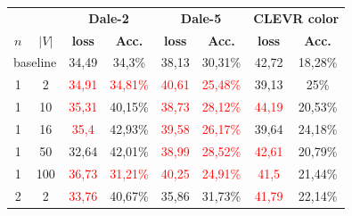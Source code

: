 \begin{table}[ht]
    \centering
    \begin{tabular}{cc|cc|cc|cc}
        \toprule
                                      &         & \multicolumn{2}{c}{\textbf{Dale-2}} & \multicolumn{2}{c}{\textbf{Dale-5}} & \multicolumn{2}{c}{\textbf{CLEVR color}}                                                                                \\  \cmidrule(lr){3-4}\cmidrule(lr){5-6}\cmidrule(lr){7-8}
        $n$                           & $|V|$   & \textbf{loss}                       & \textbf{Acc.}                       & \textbf{loss}                            & \textbf{Acc.}            & \textbf{loss}          & \textbf{Acc.}            \\\midrule
        \multicolumn{2}{c|}{baseline} & {34,49} & {34,3\%}                            & {38,13}                             & {30,31\%}                                & {42,72}                  & {18,28\%}                                         \\\midrule
        {1}                           & {2}     & \textcolor{red}{34,91}              & \textcolor{red}{34,81\%}            & \textcolor{red}{40,61}                   & \textcolor{red}{25,48\%} & {39,13}                & {25\%}                   \\
        {1}                           & {10}    & \textcolor{red}{35,31}              & {40,15\%}                           & \textcolor{red}{38,73}                   & \textcolor{red}{28,12\%} & \textcolor{red}{44,19} & {20,53\%}                \\
        {1}                           & {16}    & \textcolor{red}{35,4}               & {42,93\%}                           & \textcolor{red}{39,58}                   & \textcolor{red}{26,17\%} & {39,64}                & {24,18\%}                \\
        {1}                           & {50}    & {32,64}                             & {42,01\%}                           & \textcolor{red}{38,99}                   & \textcolor{red}{28,52\%} & \textcolor{red}{42,61} & {20,79\%}                \\
        {1}                           & {100}   & \textcolor{red}{36,73}              & \textcolor{red}{31,21\%}            & \textcolor{red}{40,25}                   & \textcolor{red}{24,91\%} & \textcolor{red}{41,5}  & {21,44\%}                \\
        {2}                           & {2}     & \textcolor{red}{33,76}              & {40,67\%}                           & {35,86}                                  & {31,73\%}                & \textcolor{red}{41,79} & {22,14\%}                \\

\end{tabular}
\end{table}
